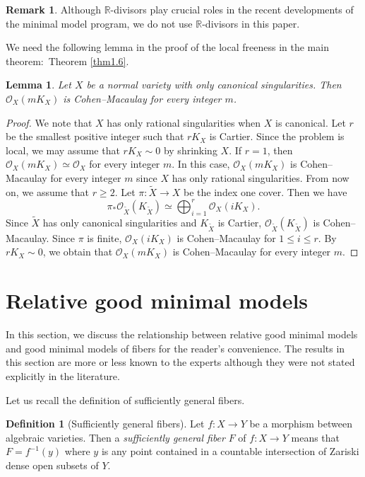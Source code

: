 \documentclass[12pt,twoside]{amsart}
\newtheorem{lem}[thm]{Lemma}
\theoremstyle{definition}
\newtheorem{defn}[thm]{Definition}
\newtheorem{rem}[thm]{Remark}
\begin{document}
\begin{rem}\label{rem2.3} 
Although $\mathbb R$-divisors play crucial roles in the 
recent developments of the minimal model program, 
we do not use $\mathbb R$-divisors in this paper. 
\end{rem}

We need the following lemma in the proof of 
the local freeness in the main theorem:~Theorem \ref{thm1.6}. 

\begin{lem}\label{lem2.4}
Let $X$ be a normal variety with only canonical singularities. 
Then $\mathcal O_X(mK_X)$ is Cohen--Macaulay for every integer $m$. 
\end{lem}

\begin{proof}
We note that $X$ has only rational singularities when $X$ is canonical. 
Let $r$ be the smallest positive integer such that 
$rK_X$ is Cartier. 
Since the problem is local, we may assume that 
$rK_X\sim 0$ by shrinking $X$. 
If $r=1$, then $\mathcal O_X(mK_X)\simeq \mathcal O_X$ for 
every integer $m$. 
In this case, $\mathcal O_X(mK_X)$ is Cohen--Macaulay for every 
integer $m$ since $X$ has only rational singularities. 
From now on, we assume that 
$r\geq 2$. 
Let $\pi:\widetilde X\to X$ be the index one cover. 
Then we have 
$$
\pi_*\mathcal O_{\widetilde X}(K_{\widetilde X})\simeq 
\bigoplus _{i=1}^r \mathcal O_X(iK_X). 
$$ 
Since $\widetilde X$ has only canonical singularities and 
$K_{\widetilde X}$ is Cartier, 
$\mathcal O_{\widetilde X}(K_{\widetilde X})$ is Cohen--Macaulay. 
Since $\pi$ is finite, 
$\mathcal O_X(iK_X)$ is Cohen--Macaulay for $1\leq i\leq r$. 
By $rK_X\sim 0$, we obtain that 
$\mathcal O_X(mK_X)$ is Cohen--Macaulay for 
every integer $m$. 
\end{proof}

\section{Relative good minimal models}\label{sec3}
In this section, we discuss the relationship between 
relative good minimal models and 
good minimal models of fibers for the reader's convenience. 
The results in this section are more or less known to the experts 
although they were not stated explicitly in the literature. 

Let us recall the definition of sufficiently general fibers. 

\begin{defn}[Sufficiently general fibers]\label{def3.1}
Let $f:X\to Y$ be a morphism between algebraic varieties. 
Then a {\em{sufficiently general fiber}} $F$ of $f:X\to Y$ means that 
$F=f^{-1}(y)$ where $y$ is any point contained in a countable 
intersection of Zariski dense open subsets of $Y$. 
\end{defn}
\end{document}
